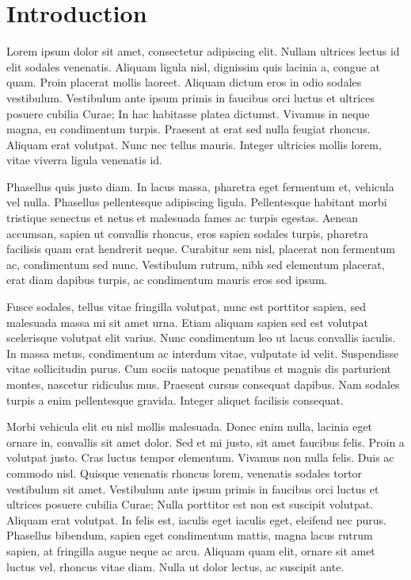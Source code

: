 \chapter{Introduction}

Lorem ipsum dolor sit amet, consectetur adipiscing elit. Nullam ultrices lectus id elit sodales venenatis. Aliquam ligula nisl, dignissim quis lacinia a, congue at quam. Proin placerat mollis laoreet. Aliquam dictum eros in odio sodales vestibulum. Vestibulum ante ipsum primis in faucibus orci luctus et ultrices posuere cubilia Curae; In hac habitasse platea dictumst. Vivamus in neque magna, eu condimentum turpis. Praesent at erat sed nulla feugiat rhoncus. Aliquam erat volutpat. Nunc nec tellus mauris. Integer ultricies mollis lorem, vitae viverra ligula venenatis id.

Phasellus quis justo diam. In lacus massa, pharetra eget fermentum et, vehicula vel nulla. Phasellus pellentesque adipiscing ligula. Pellentesque habitant morbi tristique senectus et netus et malesuada fames ac turpis egestas. Aenean accumsan, sapien ut convallis rhoncus, eros sapien sodales turpis, pharetra facilisis quam erat hendrerit neque. Curabitur sem nisl, placerat non fermentum ac, condimentum sed nunc. Vestibulum rutrum, nibh sed elementum placerat, erat diam dapibus turpis, ac condimentum mauris eros sed ipsum.

Fusce sodales, tellus vitae fringilla volutpat, nunc est porttitor sapien, sed malesuada massa mi sit amet urna. Etiam aliquam sapien sed est volutpat scelerisque volutpat elit varius. Nunc condimentum leo ut lacus convallis iaculis. In massa metus, condimentum ac interdum vitae, vulputate id velit. Suspendisse vitae sollicitudin purus. Cum sociis natoque penatibus et magnis dis parturient montes, nascetur ridiculus mus. Praesent cursus consequat dapibus. Nam sodales turpis a enim pellentesque gravida. Integer aliquet facilisis consequat.

Morbi vehicula elit eu nisl mollis malesuada. Donec enim nulla, lacinia eget ornare in, convallis sit amet dolor. Sed et mi justo, sit amet faucibus felis. Proin a volutpat justo. Cras luctus tempor elementum. Vivamus non nulla felis. Duis ac commodo nisl. Quisque venenatis rhoncus lorem, venenatis sodales tortor vestibulum sit amet. Vestibulum ante ipsum primis in faucibus orci luctus et ultrices posuere cubilia Curae; Nulla porttitor est non est suscipit volutpat. Aliquam erat volutpat. In felis est, iaculis eget iaculis eget, eleifend nec purus. Phasellus bibendum, sapien eget condimentum mattis, magna lacus rutrum sapien, at fringilla augue neque ac arcu. Aliquam quam elit, ornare sit amet luctus vel, rhoncus vitae diam. Nulla ut dolor lectus, ac suscipit ante.

